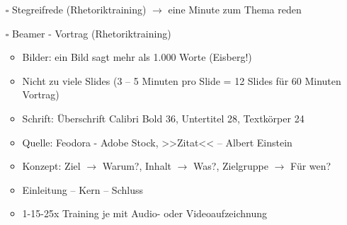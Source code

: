 \documentclass[a4paper,12pt,fleqn,parskip=half]{scrartcl}
\begin{document}
\begin{itemize}
	\item [$\square$] Stegreifrede (Rhetoriktraining) $\to$ eine Minute zum Thema reden
	\item [$\square$] Beamer - Vortrag (Rhetoriktraining)
	\begin{itemize} 
		\item Bilder: ein Bild sagt mehr als 1.000 Worte (Eisberg!)
		\item Nicht zu viele Slides (3 -- 5 Minuten pro Slide = 12 Slides für 60 Minuten Vortrag)
		\item Schrift: Überschrift Calibri Bold 36, Untertitel 28, Textkörper 24
		\item Quelle: Feodora - Adobe Stock, >>Zitat<< -- Albert Einstein
		\item Konzept: Ziel $\to$ Warum?, Inhalt $\to$ Was?, Zielgruppe $\to$ Für wen?
		\item Einleitung -- Kern -- Schluss
		\item 1-15-25x Training je mit Audio- oder Videoaufzeichnung
	\end{itemize}
\end{itemize}
\end{document}
